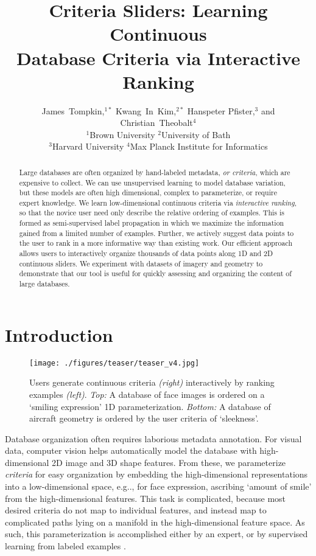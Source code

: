 \documentclass{article}
\makeatletter
\DeclareRobustCommand\onedot{\futurelet\@let@token\@onedot}
\def\@onedot{\ifx\@let@token.\else.\null\fi\xspace}
\def\eg{{e.g}\onedot} \def\Eg{{E.g}\onedot}
\makeatother
\begin{document}
\title{Criteria Sliders: Learning Continuous\\Database Criteria via Interactive Ranking}
\author{James~Tompkin,$^{1*}$ Kwang~In~Kim,$^{2*}$ Hanspeter Pfister,$^3$ and Christian~Theobalt$^4$\\
$^1$Brown University
$^2$University of Bath \\
$^3$Harvard University 
$^4$Max Planck Institute for Informatics 
}
\date{}

\maketitle

\begin{abstract}\noindent
Large databases are often organized by hand-labeled metadata, \textit{or criteria}, which are expensive to collect. We can use unsupervised learning to model database variation, but these models are often high dimensional, complex to parameterize, or require expert knowledge. We learn low-dimensional continuous criteria via \emph{interactive ranking}, so that the novice user need only describe the relative ordering of examples. This is formed as semi-supervised label propagation in which we maximize the information gained from a limited number of examples. Further, we actively suggest data points to the user to rank in a more informative way than existing work. Our efficient approach allows users to interactively organize thousands of data points along 1D and 2D continuous sliders. We experiment with datasets of imagery and geometry to demonstrate that our tool is useful for quickly assessing and organizing the content of large databases.
\end{abstract}



\section{Introduction}
\begin{figure}[t]
    \centering
		\texttt{[image: ./figures/teaser/teaser\_v4.jpg]}
    \caption{Users generate continuous criteria \emph{(right)} interactively by ranking examples \emph{(left)}. \emph{Top:} A database of face images is ordered on a `smiling expression' 1D parameterization. \emph{Bottom:} A database of aircraft geometry is ordered by the user criteria of `sleekness'.}
    \label{fig:teaser}
\end{figure}

Database organization often requires laborious metadata annotation. For visual data, computer vision helps automatically model the database with high-dimensional 2D image and 3D shape features. From these, we parameterize \emph{criteria} for easy organization by embedding the high-dimensional representations into a low-dimensional space, \eg, for face expression, ascribing `amount of smile' from the high-dimensional features. This task is complicated, because most desired criteria do not map to individual features, and instead map to complicated paths lying on a manifold in the high-dimensional feature space. As such, this parameterization is accomplished either by an expert, or by supervised learning from labeled examples \cite{ParGra11,ChenBennett2013}.
\end{document}
